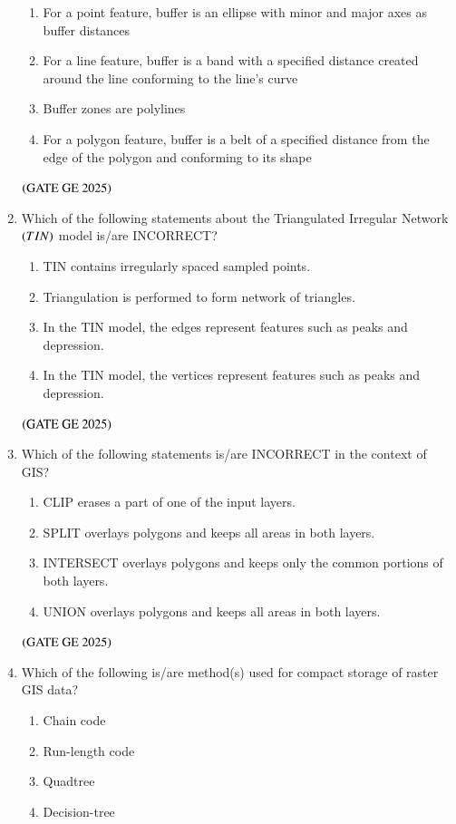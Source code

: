 \documentclass[journal,12pt,onecolumn]{IEEEtran}
\theoremstyle{remark}
\begin{document}
\begin{enumerate}
\begin{enumerate}
\item For a point feature, buffer is an ellipse with minor and major axes as buffer distances
\item For a line feature, buffer is a band with a specified distance created around the line conforming to the line's curve
\item Buffer zones are polylines
\item For a polygon feature, buffer is a belt of a specified distance from the edge of the polygon and conforming to its shape
\end{enumerate}
\hfill $\left(\text{GATE GE 2025}\right)$
\bigskip
\item Which of the following statements about the Triangulated Irregular Network $\left(TIN\right)$ model is/are INCORRECT?
\begin{enumerate}
\item TIN contains irregularly spaced sampled points.
\item Triangulation is performed to form network of triangles.
\item In the TIN model, the edges represent features such as peaks and depression.
\item In the TIN model, the vertices represent features such as peaks and depression.
\end{enumerate}
\hfill $\left(\text{GATE GE 2025}\right)$
\bigskip
\item Which of the following statements is/are INCORRECT in the context of GIS?
\begin{enumerate}
\item CLIP erases a part of one of the input layers.
\item SPLIT overlays polygons and keeps all areas in both layers.
\item INTERSECT overlays polygons and keeps only the common portions of both layers.
\item UNION overlays polygons and keeps all areas in both layers.
\end{enumerate}
\hfill $\left(\text{GATE GE 2025}\right)$
\bigskip
\item Which of the following is/are method(s) used for compact storage of raster GIS data?
\begin{enumerate}
\item Chain code
\item Run-length code
\item Quadtree
\item Decision-tree
\end{enumerate}

\end{enumerate}
\end{document}
